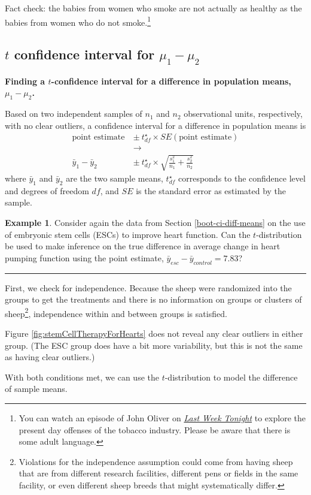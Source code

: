 \documentclass[
  10pt,
  openany]{book}
\theoremstyle{definition}
\theoremstyle{definition}
\newtheorem{example}{Example}[chapter]
\theoremstyle{definition}
\theoremstyle{definition}
\theoremstyle{remark}
\begin{document}
Fact check: the babies from women who smoke are not actually
as healthy as the babies from women who do not
smoke.\footnote{You can watch an episode of John Oliver
  on \href{https://youtu.be/6UsHHOCH4q8}{\emph{Last Week Tonight}} to explore the present day
  offenses of the tobacco industry.
  Please be aware that there is some adult language.}


\subsection{\texorpdfstring{\(t\) confidence interval for \(\mu_1 - \mu_2\)}{t confidence interval for \textbackslash mu\_1 - \textbackslash mu\_2}}\label{t-confidence-interval-for-mu_1---mu_2}

\textbf{Finding a \(t\)-confidence interval for a difference in population means, \(\mu_1 - \mu_2\).}

Based on two independent samples of \(n_1\) and \(n_2\) observational units, respectively, with no clear outliers, a confidence interval for a difference in population
means is
\begin{align*}
  \text{point estimate} \ &\pm\  t^{\star}_{df} \times SE(\text{point estimate}) \\
  &\to \\
  \bar{y}_1 - \bar{y}_2 \ &\pm\  t^{\star}_{df} \times \sqrt{\frac{s_1^2}{n_1} + \frac{s_2^2}{n_2}}
  \end{align*}
where \(\bar{y}_1\) and \(\bar{y}_2\) are the two sample means, \(t^{\star}_{df}\)
corresponds to the confidence level and degrees of freedom
\(df\), and \(SE\) is the standard error as estimated by
the sample.

\begin{example}
Consider again the data from Section \ref{boot-ci-diff-means} on the use of embryonic stem cells (ESCs) to improve heart function. Can the \(t\)-distribution be used to make
inference on the true difference in average change in heart pumping function using the point estimate,
\(\bar{y}_{esc} - \bar{y}_{control} = 7.83\)?

\begin{center}\rule{0.5\linewidth}{0.5pt}\end{center}

First, we check for independence.
Because the sheep were randomized into
the groups to get the treatments and there is no information on groups or clusters of sheep\footnote{Violations for the independence assumption could come from having sheep that are from different research facilities, different pens or fields in the same facility, or even different sheep breeds that might systematically differ.}, independence within
and between groups is satisfied.

Figure \ref{fig:stemCellTherapyForHearts}
does not reveal any clear outliers
in either group.
(The ESC group does have a bit more variability,
but this is not the same as having clear outliers.)

With both conditions met, we can use the
\(t\)-distribution to model the difference of sample means.
\end{example}
\end{document}

